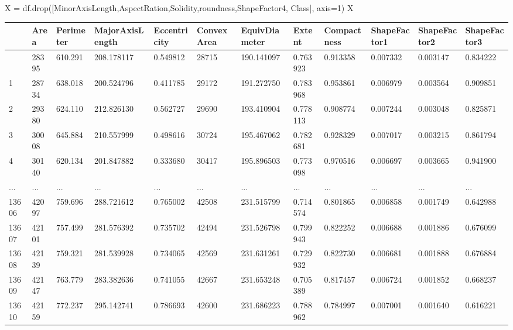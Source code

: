 \documentclass[
  letterpaper,
]{krantz}
\makeatletter
\newenvironment{Shaded}{\begin{snugshade}}{\end{snugshade}}
\newcommand{\DecValTok}[1]{\textcolor[rgb]{0.68,0.00,0.00}{#1}}
\newcommand{\NormalTok}[1]{\textcolor[rgb]{0.00,0.23,0.31}{#1}}
\newcommand{\OperatorTok}[1]{\textcolor[rgb]{0.37,0.37,0.37}{#1}}
\newcommand{\StringTok}[1]{\textcolor[rgb]{0.13,0.47,0.30}{#1}}
\newenvironment{kframe}{%
\medskip{}
\setlength{\fboxsep}{.8em}
 \def\at@end@of@kframe{}%
 \ifinner\ifhmode%
  \def\at@end@of@kframe{\end{minipage}}%
  \begin{minipage}{\columnwidth}%
 \fi\fi%
 \def\FrameCommand##1{\hskip\@totalleftmargin \hskip-\fboxsep
 \colorbox{shadecolor}{##1}\hskip-\fboxsep
     \hskip-\linewidth \hskip-\@totalleftmargin \hskip\columnwidth}%
 \MakeFramed {\advance\hsize-\width
   \@totalleftmargin\z@ \linewidth\hsize
   \@setminipage}}%
 {\par\unskip\endMakeFramed%
 \at@end@of@kframe}
\renewenvironment{Shaded}{\begin{kframe}}{\end{kframe}}
\makeatother
\begin{document}
\begin{Shaded}
\begin{Highlighting}[]
\NormalTok{X }\OperatorTok{=}\NormalTok{ df.drop([}\StringTok{\textquotesingle{}MinorAxisLength\textquotesingle{}}\NormalTok{,}\StringTok{\textquotesingle{}AspectRation\textquotesingle{}}\NormalTok{,}\StringTok{\textquotesingle{}Solidity\textquotesingle{}}\NormalTok{,}\StringTok{\textquotesingle{}roundness\textquotesingle{}}\NormalTok{,}\StringTok{\textquotesingle{}ShapeFactor4\textquotesingle{}}\NormalTok{, }\StringTok{\textquotesingle{}Class\textquotesingle{}}\NormalTok{], axis}\OperatorTok{=}\DecValTok{1}\NormalTok{)}
\NormalTok{X}
\end{Highlighting}
\end{Shaded}

\begin{longtable}[]{@{}llllllllllll@{}}
\toprule\noalign{}
& Area & Perimeter & MajorAxisLength & Eccentricity & ConvexArea &
EquivDiameter & Extent & Compactness & ShapeFactor1 & ShapeFactor2 &
ShapeFactor3 \\
\midrule\noalign{}
\endhead
\bottomrule\noalign{}
\endlastfoot
0 & 28395 & 610.291 & 208.178117 & 0.549812 & 28715 & 190.141097 &
0.763923 & 0.913358 & 0.007332 & 0.003147 & 0.834222 \\
1 & 28734 & 638.018 & 200.524796 & 0.411785 & 29172 & 191.272750 &
0.783968 & 0.953861 & 0.006979 & 0.003564 & 0.909851 \\
2 & 29380 & 624.110 & 212.826130 & 0.562727 & 29690 & 193.410904 &
0.778113 & 0.908774 & 0.007244 & 0.003048 & 0.825871 \\
3 & 30008 & 645.884 & 210.557999 & 0.498616 & 30724 & 195.467062 &
0.782681 & 0.928329 & 0.007017 & 0.003215 & 0.861794 \\
4 & 30140 & 620.134 & 201.847882 & 0.333680 & 30417 & 195.896503 &
0.773098 & 0.970516 & 0.006697 & 0.003665 & 0.941900 \\
... & ... & ... & ... & ... & ... & ... & ... & ... & ... & ... & ... \\
13606 & 42097 & 759.696 & 288.721612 & 0.765002 & 42508 & 231.515799 &
0.714574 & 0.801865 & 0.006858 & 0.001749 & 0.642988 \\
13607 & 42101 & 757.499 & 281.576392 & 0.735702 & 42494 & 231.526798 &
0.799943 & 0.822252 & 0.006688 & 0.001886 & 0.676099 \\
13608 & 42139 & 759.321 & 281.539928 & 0.734065 & 42569 & 231.631261 &
0.729932 & 0.822730 & 0.006681 & 0.001888 & 0.676884 \\
13609 & 42147 & 763.779 & 283.382636 & 0.741055 & 42667 & 231.653248 &
0.705389 & 0.817457 & 0.006724 & 0.001852 & 0.668237 \\
13610 & 42159 & 772.237 & 295.142741 & 0.786693 & 42600 & 231.686223 &
0.788962 & 0.784997 & 0.007001 & 0.001640 & 0.616221 \\
\end{longtable}
\end{document}
